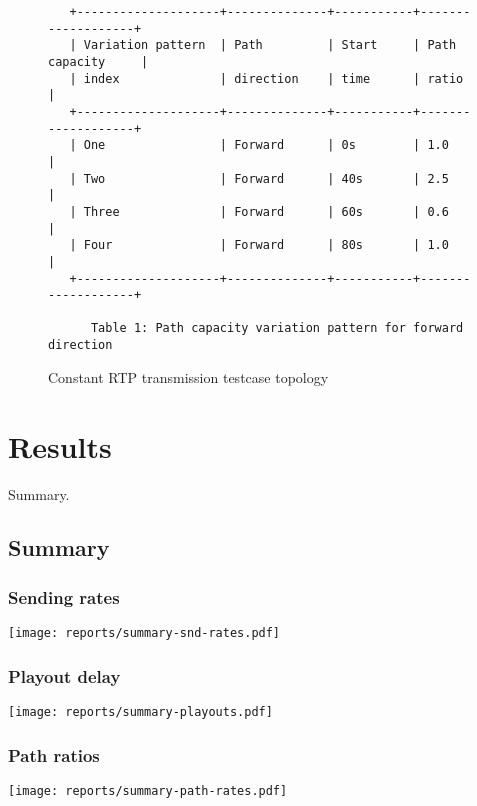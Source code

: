 \documentclass[a4paper]{article}
\begin{document}
\begin{figure}
\begin{verbatim}
   +--------------------+--------------+-----------+-------------------+
   | Variation pattern  | Path         | Start     | Path capacity     |
   | index              | direction    | time      | ratio             |
   +--------------------+--------------+-----------+-------------------+
   | One                | Forward      | 0s        | 1.0               |
   | Two                | Forward      | 40s       | 2.5               |
   | Three              | Forward      | 60s       | 0.6               |
   | Four               | Forward      | 80s       | 1.0               |
   +--------------------+--------------+-----------+-------------------+

      Table 1: Path capacity variation pattern for forward direction

\end{verbatim}
\caption{Constant RTP transmission testcase topology}
\label{fig:ascii-box}
\end{figure}




\section{Results}
\label{sec:results}

Summary.

\subsection{Summary}

\subsubsection{Sending rates}
\texttt{[image: reports/summary-snd-rates.pdf]}

\subsubsection{Playout delay}
\texttt{[image: reports/summary-playouts.pdf]}

\subsubsection{Path ratios}
\texttt{[image: reports/summary-path-rates.pdf]}
\end{document}
